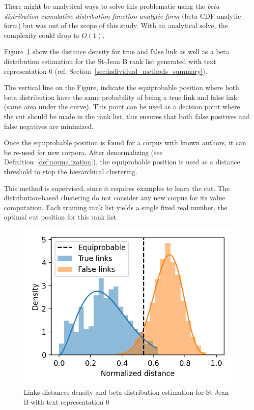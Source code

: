 There might be analytical ways to solve this problematic using the \textit{beta distribution cumulative distribution function analytic form} (beta CDF analytic form) but was out of the scope of this study.
With an analytical solve, the complexity could drop to $O(1)$.

Figure~\ref{fig:links_score_density} show the distance density for true and false link as well as a beta distribution estimation for the St-Jean B rank list generated with text representation 0 (ref. Section~\ref{sec:individual_methods_summary}).

The vertical line on the Figure, indicate the equiprobable position where both beta distribution have the same probability of being a true link and false link (same area under the curve).
This point can be used as a decision point where the cut should be made in the rank list, this ensures that both false positives and false negatives are minimized.

Once the equiprobable position is found for a corpus with known authors, it can be re-used for new corpora.
After denormalizing (see Definition~\ref{def:normalization}), the equiprobable position is used as a distance threshold to stop the hierarchical clustering.

This method is supervised, since it requires examples to learn the cut.
The distribution-based clustering do not consider any new corpus for its value computation.
Each training rank list yields a single fixed real number, the optimal cut position for this rank list.

\begin{figure}
  \caption{Links distances density and beta distribution estimation for St-Jean B with text representation 0}
  \label{fig:links_score_density}
  \includegraphics[width=\linewidth]{img/links_score_density.png}
\end{figure}

